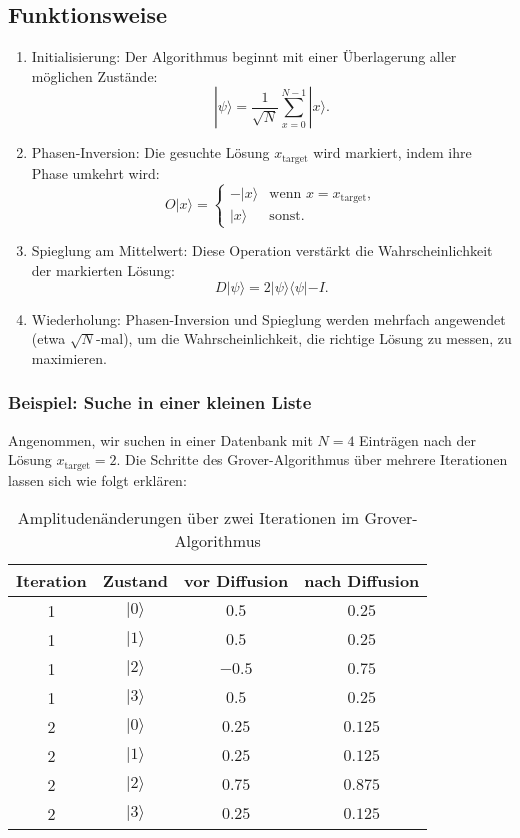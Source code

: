 \subsection{Funktionsweise}
\begin{enumerate}
    \item Initialisierung: Der Algorithmus beginnt mit einer Überlagerung aller möglichen Zustände:
        \[
        |\psi\rangle = \frac{1}{\sqrt{N}} \sum_{x=0}^{N-1} |x\rangle.
        \]

    \item Phasen-Inversion: Die gesuchte Lösung $x_{\text{target}}$ wird markiert, indem ihre Phase umkehrt wird:
        \[
        O |x\rangle = \begin{cases} 
            -|x\rangle & \text{wenn } x = x_{\text{target}}, \\
            |x\rangle & \text{sonst}.
        \end{cases}
        \]

    \item Spieglung am Mittelwert: Diese Operation verstärkt die Wahrscheinlichkeit der markierten Lösung:
        \[
        D |\psi\rangle = 2|\psi\rangle\langle\psi| - I.
        \]

    \item Wiederholung: Phasen-Inversion und Spieglung werden mehrfach angewendet (etwa $\sqrt{N}$-mal), um die 
    Wahrscheinlichkeit, die richtige Lösung zu messen, zu maximieren.
\end{enumerate}

\subsubsection{Beispiel: Suche in einer kleinen Liste}
Angenommen, wir suchen in einer Datenbank mit $N=4$ Einträgen nach der Lösung $x_{\text{target}}=2$. Die Schritte des 
Grover-Algorithmus über mehrere Iterationen lassen sich wie folgt erklären:

\begin{table}[H]
    \centering
    \begin{tabular}{|c|c|c|c|}
        \hline
        Iteration & Zustand & vor Diffusion & nach Diffusion \\
        \hline
        1 & $|0\rangle$ & $0.5$ & $0.25$ \\
        1 & $|1\rangle$ & $0.5$ & $0.25$ \\
        1 & $|2\rangle$ & $-0.5$ & $0.75$ \\
        1 & $|3\rangle$ & $0.5$ & $0.25$ \\
        \hline
        2 & $|0\rangle$ & $0.25$ & $0.125$ \\
        2 & $|1\rangle$ & $0.25$ & $0.125$ \\
        2 & $|2\rangle$ & $0.75$ & $0.875$ \\
        2 & $|3\rangle$ & $0.25$ & $0.125$ \\
        \hline
    \end{tabular}
    \caption{Amplitudenänderungen über zwei Iterationen im Grover-Algorithmus}
\end{table}

